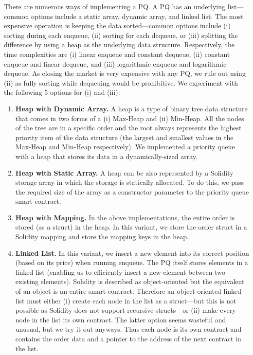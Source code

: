 There are numerous ways of implementing a PQ. A PQ has an underlying list---common options include a static array, dynamic array, and linked list. The most expensive operation is keeping the data sorted---common options include (i) sorting during each enqueue, (ii) sorting for each dequeue, or (iii) splitting the difference by using a heap as the underlying data structure. Respectively, the time complexities are (i) linear enqueue and constant dequeue, (ii) constant enqueue and linear dequeue, and (iii) logarithmic enqueue and logarithmic dequeue. As closing the market is very expensive with any PQ, we rule out using (ii) as fully sorting while dequeuing would be prohibitive. We experiment with the following 5 options for (i) and (iii):

\begin{enumerate}

\item \textbf{Heap with Dynamic Array.} A heap is a type of binary tree data structure that comes in two forms of a (i) Max-Heap and (ii) Min-Heap. All the nodes of the tree are in a specific order and the root always represents the highest priority item of the data structure (the largest and smallest values in the Max-Heap and Min-Heap respectively). We implemented a priority queue with a heap that stores its data in a dynamically-sized array. 

\item \textbf{Heap with Static Array.} A heap can be also represented by a Solidity storage array in which the storage is statically allocated. To do this, we pass the required size of the array as a constructor parameter to the priority queue smart contract. 

\item \textbf{Heap with Mapping.} In the above implementations, the entire order is stored (as a struct) in the heap. In this variant, we store the order struct in a Solidity mapping and store the mapping keys in the heap.  

\item \textbf{Linked List.} In this variant, we insert a new element into its correct position (based on its price) when running enqueue. The PQ itself stores elements in a linked list (enabling us to efficiently insert a new element between two existing elements). Solidity is described as object-oriented but the equivalent of an object is an entire smart contract. Therefore an object-oriented linked list must either (i) create each node in the list as a struct---but this is not possible as Solidity does not support recursive structs---or (ii) make every node in the list its own contract. The latter option seems wasteful and unusual, but we try it out anyways. Thus each node is its own contract and contains the order data and a pointer to the address of the next contract in the list.


\end{enumerate}
